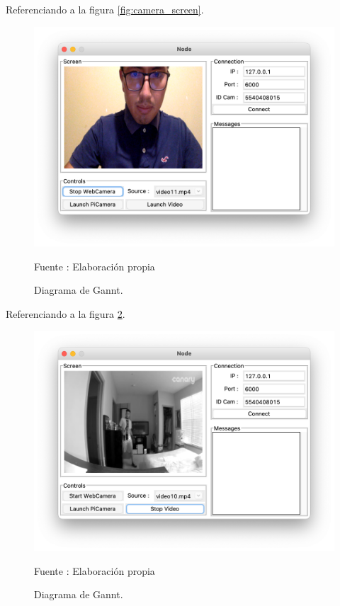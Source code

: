 Referenciando a la figura \ref{fig:camera_screen}.
\begin{figure}[H]
    \begin{center}
        \includegraphics[width=13cm]{img/capitulo_5/webcamera.png}
        \caption{Diagrama de Gannt.}
        Fuente : Elaboración propia
        \label{fig:webcamera}
    \end{center}
\end{figure}

Referenciando a la figura \ref{fig:securityvideo}.
\begin{figure}[H]
    \begin{center}
        \includegraphics[width=13cm]{img/capitulo_5/security-video.png}
        \caption{Diagrama de Gannt.}
        Fuente : Elaboración propia
        \label{fig:securityvideo}
    \end{center}
\end{figure}

